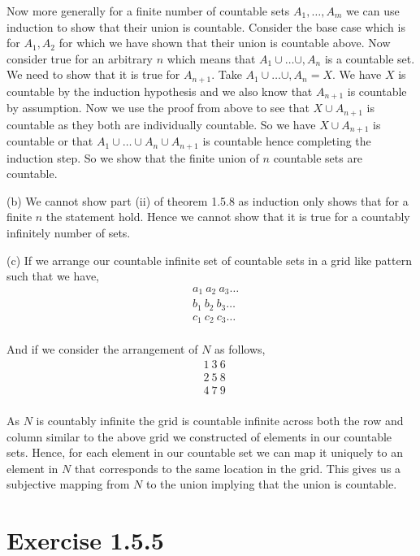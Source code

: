 \documentclass[a4paper]{report}
\begin{document}
Now more generally for a finite number of countable sets $A_1, \dots, A_m$ we can use induction to show that their union is countable. Consider the base case which is for $A_1, A_2$ for which we have shown that their union is countable above. Now consider true for an arbitrary $n$ which means that  $A_1 \cup \dots \cup, A_n$ is a countable set. We need to show that it is true for $A_{n + 1}$.             Take $A_1 \cup \dots \cup, A_n = X$. We have $X$ is countable by the induction hypothesis and we also know that $A_{n + 1}$ is countable by assumption. Now we use the proof from above to see that $X \cup A_{n + 1}$ is countable as they both are individually countable. So we have $X \cup A_{n + 1}$ is countable or that  $A_1 \cup \dots \cup A_n \cup A_{n + 1}$ is countable hence completing the induction step. So we show that the finite union of $n$ countable sets are countable.

\vspace{1em}


(b) We cannot show part (ii) of theorem 1.5.8 as induction only shows that for a finite $n$ the statement hold. Hence we cannot show that it is true for a countably infinitely number of sets.


(c) If we arrange our countable infinite set of countable sets in a grid like pattern such that we have, 
\begin{align*}
    &a_1 \: a_2 \: a_3 \dots\\
    &b_1 \: b_2 \: b_3 \dots\\
    &c_1 \: c_2 \: c_3 \dots\\
\end{align*}

And if we consider the arrangement of $N$ as follows,
\begin{align*}
    &1 \: 3 \: 6\:\\
    &2 \: 5 \: 8\:\\
    &4 \: 7 \: 9\:\\
\end{align*}

As $N$ is countably infinite the grid is countable infinite across both the row and column similar to the above grid we constructed of elements in our countable sets. Hence, for each element in our countable set we can map it uniquely to an element in $N$ that corresponds to the same location in the grid. This gives us a subjective mapping from  $N$ to the union implying that the union is countable.
\section*{Exercise 1.5.5}
\end{document}
